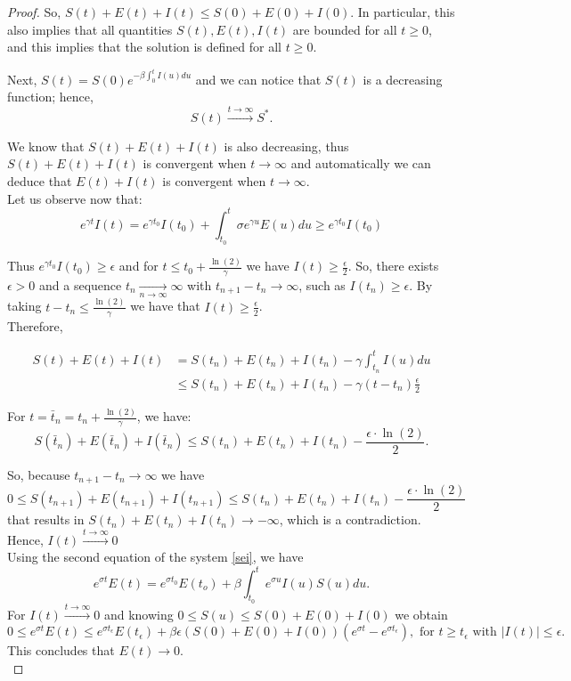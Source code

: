 \documentclass[11pt]{article}
\begin{document}
\begin{proof}
So, $S(t)+E(t)+I(t)\leq S(0)+E(0)+I(0)$. In particular, this also implies that all quantities $S(t), E(t), I(t)$ are bounded for all $t\ge0$, and this implies that the solution is defined for all $t\ge0$.  

Next, $S(t)=S(0)e^{-\beta\int_{0}^t I(u)du}$ and we can notice that $S(t)$ is a decreasing function; hence, \[
S(t)\xrightarrow{t\rightarrow\infty} S^*.
\]

We know that $S(t)+E(t)+I(t)$ is also decreasing, thus $S(t)+E(t)+I(t)$ is convergent when $t\rightarrow\infty$ and automatically we can deduce that $E(t)+I(t)$ is convergent when $t\rightarrow\infty$.\\

Let us observe now that:
$$e^{\gamma t}I(t)=e^{\gamma t_0}I(t_0)+\int_{t_0}^{t} \sigma e^{\gamma u}E(u)du\geq e^{\gamma t_0}I(t_0)$$

Thus $e^{\gamma t_0}I(t_0)\geq \epsilon$ and for $t\leq t_0+\frac{\ln(2)}{\gamma}$ we have $I(t)\geq \frac{\epsilon}{2}$. So, there exists $\epsilon>0 $ and a sequence $t_n\xrightarrow[n\rightarrow\infty]{} \infty$ with $t_{n+1}-t_n \rightarrow\infty$, such as $I(t_n)\geq \epsilon$. By taking $t-t_n\leq \frac{\ln(2)}{\gamma}$ we have that $I(t)\geq \frac{\epsilon}{2}$.\\

Therefore, 

\begin{align*}
    S(t)+E(t)+I(t) &= S(t_n)+E(t_n)+I(t_n)-\gamma \int_{t_n}^t I(u)du\\
    &\leq S(t_n)+E(t_n)+I(t_n)-\gamma (t-t_n)\frac{\epsilon}{2}
\end{align*}

For $t=\bar{t}_n=t_n+\frac{\ln(2)}{\gamma}$, we have:
$$S(\bar{t}_n)+E(\bar{t}_n)+I(\bar{t}_n)\leq S(t_n)+E(t_n)+I(t_n)-\frac{\epsilon \cdot \ln(2)}{2}.$$

So, because $t_{n+1}-t_n \rightarrow \infty$ we have
$$0\leq S(t_{n+1})+E(t_{n+1})+I(t_{n+1})\leq S(t_n)+E(t_n)+I(t_n)-\frac{\epsilon \cdot \ln(2)}{2}$$ that results in $S(t_n)+E(t_n)+I(t_n) \rightarrow -\infty$, which is a contradiction. Hence, $I(t) \xrightarrow{t \rightarrow\infty} 0$ \\

Using the second equation of the system \ref{sei}, we have
$$e^{\sigma t}E(t) = e^{\sigma t_0} E(t_o)+\beta \int_{t_0}^{t} e^{\sigma u} I(u)S(u) du.$$ 
For $I(t) \xrightarrow{t \rightarrow\infty} 0$ and knowing $0\leq S(u)\leq S(0)+E(0)+I(0)$ we obtain 
\[
0\leq e^{\sigma t} E(t)\leq e^{\sigma t_{\epsilon}}E(t_{\epsilon})+\beta \epsilon(S(0)+E(0)+I(0))(e^{\sigma t}-e^{\sigma t_{\epsilon}}), \text{ for } t\geq t_{\epsilon} \text{ with } |I(t)|\leq \epsilon.  
\]
This concludes that $E(t)\rightarrow 0$.\\


\end{proof}
\end{document}
